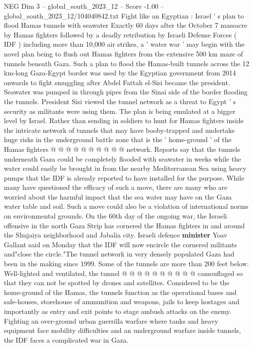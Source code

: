 \begin{textsample}{NEG Dim 3 – global\_south\_2023\_12 – Score -1.00 – global\_south\_2023\_12/104040842.txt}  \label{ex:f3_neg_034}
Fight like an Egyptian : Israel ' s plan to flood Hamas tunnels with seawater Exactly 60 days after the October 7 massacre by Hamas fighters followed by a deadly retribution by Israeli Defense Forces ( IDF ) including more than 10,000 air strikes, a ' water war ' may begin with the novel plan being to flush out Hamas fighters from the extensive 500 km maze of tunnels beneath Gaza.
Such a plan to flood the Hamas-built tunnels across the 12 km-long Gaza-Egypt border was used by the Egyptian government from 2014 onwards to fight smuggling after Abdel Fattah el-Sisi became the president.
Seawater was pumped in through pipes from the Sinai side of the border flooding the tunnels.
President Sisi viewed the tunnel network as a threat to Egypt ' s security as militants were using them.
The plan is being emulated at a bigger level by Israel.
Rather than sending in soldiers to hunt for Hamas fighters inside the intricate network of tunnels that may have booby-trapped and undertake huge risks in the underground battle zone that is the ' home-ground ' of the Hamas fighters @ @ @ @ @ @ @ @ @ @ network.
Reports say that the tunnels underneath Gaza could be completely flooded with seawater in weeks while the water could easily be brought in from the nearby Mediterranean Sea using heavy pumps that the IDF is already reported to have installed for the purpose.
While many have questioned the efficacy of such a move, there are many who are worried about the harmful impact that the sea water may have on the Gaza water table and soil.
Such a move could also be a violation of international norms on environmental grounds.
On the 60th day of the ongoing war, the Israeli offensive in the north Gaza Strip has cornered the Hamas fighters in and around the Shujaiya neighborhood and Jabalia city.
Israeli defence \textbf{minister} Yoav Gallant said on Monday that the IDF will now encircle the cornered militants and"close the circle."The tunnel network in very densely populated Gaza had been in the making since 1999.
Some of the tunnels are more than 200 feet below.
Well-lighted and ventilated, the tunnel @ @ @ @ @ @ @ @ @ @ camouflaged so that they can not be spotted by drones and satellites.
Considered to be the home-ground of the Hamas, the tunnels function as the operational bases and safe-houses, storehouse of ammunition and weapons, jails to keep hostages and importantly as entry and exit points to stage ambush attacks on the enemy.
Fighting an over-ground urban guerrilla warfare where tanks and heavy equipment face mobility difficulties and an underground warfare inside tunnels, the IDF faces a complicated war in Gaza.

\end{textsample}
